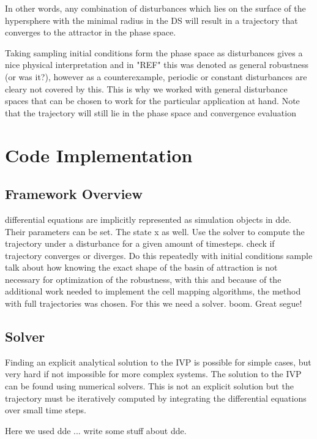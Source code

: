     In other words, any combination of disturbances which lies on the surface of the hypersphere with the minimal radius in the DS will result in a trajectory that converges to the attractor in the phase space. 

    Taking sampling initial conditions form the phase space as disturbances gives a nice physical interpretation and in "REF" this was denoted as general robustness (or was it?), however as a counterexample, periodic or constant disturbances are cleary not covered by this. 
    This is why we worked with general disturbance spaces that can be chosen to work for the particular application at hand. 
    Note that the trajectory will still lie in the phase space and convergence evaluation 



\section{Code Implementation}

\subsection{Framework Overview}


differential equations are implicitly represented as simulation objects in dde. Their parameters can be set. The state x as well. Use the solver to compute the trajectory under a disturbance for a given amount of timesteps. check if trajectory converges or diverges. Do this repeatedly with initial conditions sample
talk about how knowing the exact shape of the basin of attraction is not necessary for optimization of the robustness, with this and because of the additional work needed to implement the cell mapping algorithms, the method with full trajectories was chosen. For this we need a solver. boom. Great segue!

\subsection{Solver}

Finding an explicit analytical solution to the IVP is possible for simple cases, but very hard if not impossible for more complex systems. 
The solution to the IVP can be found using numerical solvers. This is not an explicit solution but the trajectory must be iteratively computed by integrating the differential equations over small time steps. 

Here we used dde ... write some stuff about dde.

